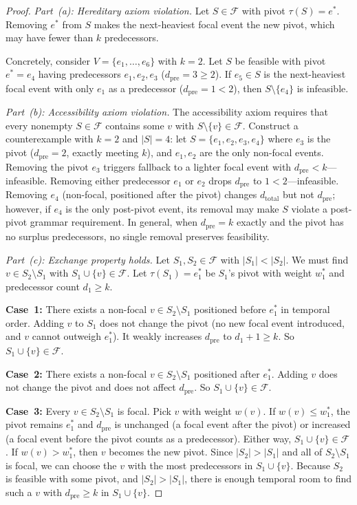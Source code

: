 \documentclass[11pt]{article}
\theoremstyle{plain}
\theoremstyle{definition}
\theoremstyle{remark}
\newcommand{\dtotal}{{d_{\mathrm{total}}}}
\newcommand{\dpre}[1][]{d_{\mathrm{pre}#1}}
\begin{document}
\begin{proof}
\emph{Part~(a): Hereditary axiom violation.}  Let $S \in \mathcal{F}$
with pivot $\tau(S) = e^*$.  Removing $e^*$ from $S$ makes the
next-heaviest focal event the new pivot, which may have fewer than $k$
predecessors.

Concretely, consider $V = \{e_1, \ldots, e_6\}$ with $k = 2$.  Let $S$
be feasible with pivot $e^* = e_4$ having predecessors $e_1, e_2, e_3$
($\dpre = 3 \ge 2$).  If $e_5 \in S$ is the next-heaviest focal event
with only $e_1$ as a predecessor ($\dpre = 1 < 2$), then
$S \setminus \{e_4\}$ is infeasible.

\emph{Part~(b): Accessibility axiom violation.}  The accessibility
axiom requires that every nonempty $S \in \mathcal{F}$ contains some
$v$ with $S \setminus \{v\} \in \mathcal{F}$.  Construct a
counterexample with $k = 2$ and $|S| = 4$: let $S = \{e_1, e_2, e_3,
e_4\}$ where $e_3$ is the pivot ($\dpre = 2$, exactly meeting $k$),
and $e_1, e_2$ are the only non-focal events.  Removing the pivot
$e_3$ triggers fallback to a lighter focal event with
$\dpre < k$---infeasible.  Removing either predecessor $e_1$ or $e_2$
drops $\dpre$ to $1 < 2$---infeasible.  Removing $e_4$ (non-focal,
positioned after the pivot) changes $\dtotal$ but not $\dpre$; however,
if $e_4$ is the only post-pivot event, its removal may make $S$
violate a post-pivot grammar requirement.  In general, when $\dpre =
k$ exactly and the pivot has no surplus predecessors, no single removal
preserves feasibility.

\emph{Part~(c): Exchange property holds.}  Let $S_1, S_2 \in
\mathcal{F}$ with $|S_1| < |S_2|$.  We must find $v \in S_2 \setminus
S_1$ with $S_1 \cup \{v\} \in \mathcal{F}$.  Let $\tau(S_1) = e^*_1$
be $S_1$'s pivot with weight $w_1^*$ and predecessor count
$d_1 \ge k$.

\textbf{Case~1:} There exists a non-focal $v \in S_2 \setminus S_1$
positioned before $e^*_1$ in temporal order.  Adding $v$ to $S_1$ does
not change the pivot (no new focal event introduced, and $v$ cannot
outweigh $e^*_1$).  It weakly increases $\dpre$ to $d_1 + 1 \ge k$.
So $S_1 \cup \{v\} \in \mathcal{F}$.

\textbf{Case~2:} There exists a non-focal $v \in S_2 \setminus S_1$
positioned after $e^*_1$.  Adding $v$ does not change the pivot and
does not affect $\dpre$.  So $S_1 \cup \{v\} \in \mathcal{F}$.

\textbf{Case~3:} Every $v \in S_2 \setminus S_1$ is focal.  Pick
$v$ with weight $w(v)$.  If $w(v) \le w_1^*$, the pivot remains
$e^*_1$ and $\dpre$ is unchanged (a focal event after the pivot) or
increased (a focal event before the pivot counts as a predecessor).
Either way, $S_1 \cup \{v\} \in \mathcal{F}$.  If $w(v) > w_1^*$,
then $v$ becomes the new pivot.  Since $|S_2| > |S_1|$ and all of
$S_2 \setminus S_1$ is focal, we can choose the $v$ with the most
predecessors in $S_1 \cup \{v\}$.  Because $S_2$ is feasible with some
pivot, and $|S_2| > |S_1|$, there is enough temporal room to find such
a $v$ with $\dpre \ge k$ in $S_1 \cup \{v\}$.


\end{proof}
\end{document}
